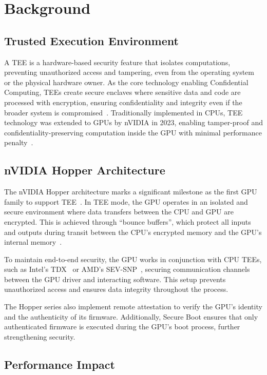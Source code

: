 \documentclass{article}
\begin{document}
\section{Background}

\subsection{Trusted Execution Environment}

A TEE is a hardware-based security feature that isolates computations, preventing unauthorized access and tampering, even from the operating system or the physical hardware owner. As the core technology enabling Confidential Computing, TEEs create secure enclaves where sensitive data and code are processed with encryption, ensuring confidentiality and integrity even if the broader system is compromised~\cite{sabt2015trusted}. Traditionally implemented in CPUs, TEE technology was extended to GPUs by nVIDIA in 2023, enabling tamper-proof and confidentiality-preserving computation inside the GPU with minimal performance penalty~\cite{dhanuskodi2023creating}.

\subsection{nVIDIA Hopper Architecture}

The nVIDIA Hopper architecture marks a significant milestone as the first GPU family to support TEE~\cite{nvidiacc}. In TEE mode, the GPU operates in an isolated and secure environment where data transfers between the CPU and GPU are encrypted. This is achieved through ``bounce buffers'', which protect all inputs and outputs during transit between the CPU’s encrypted memory and the GPU’s internal memory~\cite{dhanuskodi2023creating}.

To maintain end-to-end security, the GPU works in conjunction with CPU TEEs, such as Intel’s TDX~\cite{TDX} or AMD’s SEV-SNP~\cite{SEV-SNP, sev2020strengthening}, securing communication channels between the GPU driver and interacting software. This setup prevents unauthorized access and ensures data integrity throughout the process.

The Hopper series also implement remote attestation to verify the GPU’s identity and the authenticity of its firmware. Additionally, Secure Boot ensures that only authenticated firmware is executed during the GPU’s boot process, further strengthening security.

\subsection{Performance Impact}
\end{document}
